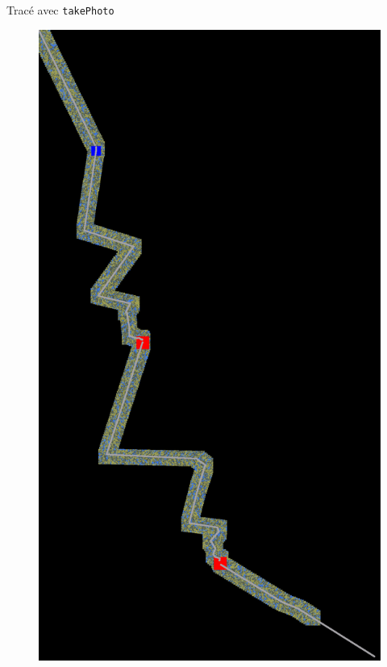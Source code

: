 \documentclass{beamer}
\begin{document}
\begin{frame}{Tracé avec \texttt{takePhoto}}
    \begin{figure}
        \centering
        \includegraphics[height=0.7\paperheight]{map.png}
    \end{figure}
\end{frame}
\end{document}
